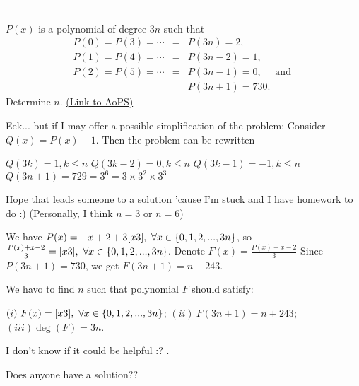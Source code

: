 -------------------------------------------------------------------------------

\begin{problem}
	$P(x)$ is a polynomial of degree $3n$ such that
\begin{eqnarray*} P(0) = P(3) = \cdots &=& P(3n) = 2, \\ P(1) = P(4) = \cdots &=& P(3n-2) = 1, \\ P(2) = P(5) = \cdots &=& P(3n-1) = 0, \quad\text{ and }\\ && P(3n+1) = 730.\end{eqnarray*}
Determine $n$.
	\flushright \href{https://artofproblemsolving.com/community/c6h62982}{(Link to AoPS)}
\end{problem}



\begin{solution}
	Eek... but if I may offer a possible simplification of the problem:  Consider $Q(x) = P(x) - 1$.  Then the problem can be rewritten

$Q(3k) = 1, k \le n$
$Q(3k-2) = 0, k \le n$
$Q(3k-1) = -1, k \le n$
$Q(3n+1) = 729 = 3^6 = 3 \times 3^2 \times 3^3$

Hope that leads someone to a solution 'cause I'm stuck and I have homework to do  :)   (Personally, I think $n = 3$ or $n = 6$)
\end{solution}



\begin{solution}
	We have 
$P(x)=-x+2+3[x\/3], \ \forall x\in\{0,1,2,...,3n\}$,
so 
$\frac{P(x)+x-2}{3}=[x\/3], \ \forall x\in\{0,1,2,...,3n\}$.
Denote 
$F(x)=\frac{P(x)+x-2}{3}$
Since $P(3n+1)=730$, we get $F(3n+1)=n+243$.

We havo to find $n$ such that polynomial $F$ should satisfy:

$(i) \ F(x)=[x\/3], \ \forall x\in\{0,1,2,...,3n\}$;
$(ii) \ F(3n+1)=n+243$;
$(iii) \deg(F)=3n$.

I don't know if it could be helpful :? .
\end{solution}



\begin{solution}
	Does anyone have a solution??
\end{solution}



